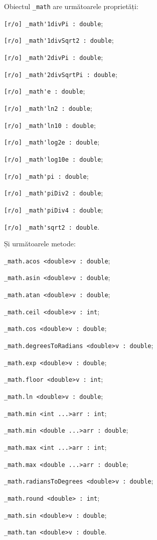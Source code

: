 Obiectul \lstinline|_math| are următoarele proprietăți:
\begin{icItems}
	\item \lstinline|[r/o] _math'1divPi : double|;
	\item \lstinline|[r/o] _math'1divSqrt2 : double|;
	\item \lstinline|[r/o] _math'2divPi : double|;
	\item \lstinline|[r/o] _math'2divSqrtPi : double|;
	\item \lstinline|[r/o] _math'e : double|;
	\item \lstinline|[r/o] _math'ln2 : double|;
	\item \lstinline|[r/o] _math'ln10 : double|;
	\item \lstinline|[r/o] _math'log2e : double|;
	\item \lstinline|[r/o] _math'log10e : double|;
	\item \lstinline|[r/o] _math'pi : double|;
	\item \lstinline|[r/o] _math'piDiv2 : double|;
	\item \lstinline|[r/o] _math'piDiv4 : double|;
	\item \lstinline|[r/o] _math'sqrt2 : double|.
\end{icItems}

Și următoarele metode:
\begin{icItems}
	\item \lstinline|_math.acos <double>v : double|;
	\item \lstinline|_math.asin <double>v : double|;
	\item \lstinline|_math.atan <double>v : double|;
	\item \lstinline|_math.ceil <double>v : int|;
	\item \lstinline|_math.cos <double>v : double|;
	\item \lstinline|_math.degreesToRadians <double>v : double|;
	\item \lstinline|_math.exp <double>v : double|;
	\item \lstinline|_math.floor <double>v : int|;
	\item \lstinline|_math.ln <double>v : double|;
	\item \lstinline|_math.min <int ...>arr : int|;
	\item \lstinline|_math.min <double ...>arr : double|;
	\item \lstinline|_math.max <int ...>arr : int|;
	\item \lstinline|_math.max <double ...>arr : double|;
	\item \lstinline|_math.radiansToDegrees <double>v : double|;
	\item \lstinline|_math.round <double> : int|;
	\item \lstinline|_math.sin <double>v : double|;
	\item \lstinline|_math.tan <double>v : double|.
\end{icItems}


